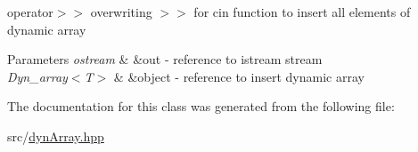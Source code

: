 operator$>$$>$ overwriting $>$$>$ for cin function to insert all elements of dynamic array 


\begin{DoxyParams}{Parameters}
{\em ostream} & \&out -\/ reference to istream stream \\
\hline
{\em Dyn\+\_\+array$<$\+T$>$} & \&object -\/ reference to insert dynamic array \\
\hline
\end{DoxyParams}


The documentation for this class was generated from the following file\+:\begin{DoxyCompactItemize}
\item 
src/\hyperlink{dynArray_8hpp}{dyn\+Array.\+hpp}\end{DoxyCompactItemize}
